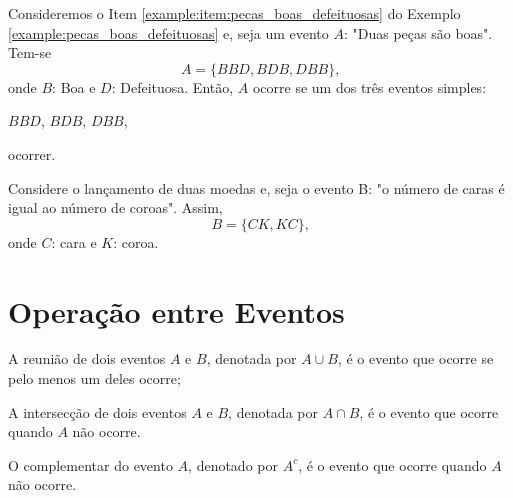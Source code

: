 \begin{example}
	Consideremos o Item \ref{example:item:pecas_boas_defeituosas} do Exemplo \ref{example:pecas_boas_defeituosas} e, seja um evento $A$: "Duas peças são boas". Tem-se
	\[
		A=\{BBD, BDB, DBB\}\text{,}
	\]
	onde $B$: Boa e $D$: Defeituosa. Então, $A$ ocorre se um dos três eventos simples:
	\begin{center}
		$BBD$, $BDB$, $DBB$,
	\end{center}
	ocorrer.
\end{example}

\begin{example}
	Considere o lançamento de duas moedas e, seja o evento B: "o número de caras é igual ao número de coroas". Assim,
	\[
		B=\{CK, KC\}\text{,}
	\]
	onde $C$: cara e $K$: coroa.
\end{example}

\section{Operação entre Eventos}

\begin{definition}
	\label{def:reuniao_dois_eventos}
	A reunião de dois eventos $A$ e $B$, denotada por $A\cup B$, é o evento que ocorre se pelo menos um deles ocorre;
\end{definition}

\begin{definition}
	\label{def:intercecao_dois_eventos}
	A intersecção de dois eventos $A$ e $B$, denotada por $A\cap B$, é o evento que ocorre quando $A$ não ocorre.
\end{definition}

\begin{definition}
	\label{def:complementar_evento}
	O complementar do evento $A$, denotado por $A^{c}$, é o evento que ocorre quando $A$ não ocorre.
\end{definition}

